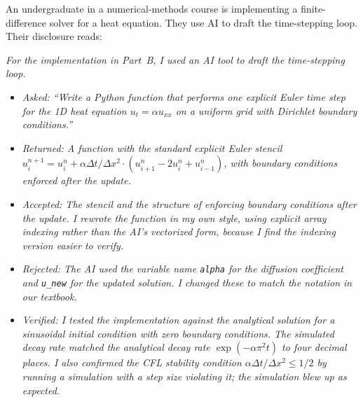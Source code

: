 \documentclass[11pt]{book}
\begin{document}
\begin{example}
An undergraduate in a numerical-methods course is implementing a finite-difference solver for a heat equation. They use AI to draft the time-stepping loop. Their disclosure reads:

\medskip
\noindent \emph{For the implementation in Part~B, I used an AI tool to draft the time-stepping loop.}
\begin{itemize}\setlength{\itemsep}{1pt}
\item[1.] \emph{Asked: ``Write a Python function that performs one explicit Euler time step for the 1D heat equation $u_t = \alpha u_{xx}$ on a uniform grid with Dirichlet boundary conditions.''}
\item[2.] \emph{Returned: A function with the standard explicit Euler stencil $u_i^{n+1} = u_i^n + \alpha \Delta t / \Delta x^2 \cdot (u_{i+1}^n - 2 u_i^n + u_{i-1}^n)$, with boundary conditions enforced after the update.}
\item[3.] \emph{Accepted: The stencil and the structure of enforcing boundary conditions after the update. I rewrote the function in my own style, using explicit array indexing rather than the AI's vectorized form, because I find the indexing version easier to verify.}
\item[4.] \emph{Rejected: The AI used the variable name \texttt{alpha} for the diffusion coefficient and \texttt{u\_new} for the updated solution. I changed these to match the notation in our textbook.}
\item[5.] \emph{Verified: I tested the implementation against the analytical solution for a sinusoidal initial condition with zero boundary conditions. The simulated decay rate matched the analytical decay rate $\exp(-\alpha \pi^2 t)$ to four decimal places. I also confirmed the CFL stability condition $\alpha \Delta t / \Delta x^2 \le 1/2$ by running a simulation with a step size violating it; the simulation blew up as expected.}
\end{itemize}
\end{example}
\end{document}
